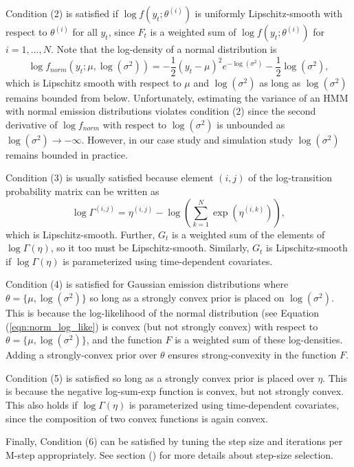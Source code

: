 Condition (2) is satisfied if $\log f(y_t ; \theta^{(i)})$ is uniformly Lipschitz-smooth with respect to $\theta^{(i)}$ for all $y_t$, since $F_t$ is a weighted sum of $\log f(y_t ; \theta^{(i)})$ for $i = 1,\ldots,N$. Note that the log-density of a normal distribution is
%
\begin{equation}
    \log f_{norm}\left(y_t;\mu,\log(\sigma^2)\right) = -\frac{1}{2}(y_t-\mu)^2 e^{-\log(\sigma^2)} - \frac{1}{2} \log(\sigma^2),
    \label{eqn:norm_log_like}
\end{equation}
%
which is Lipschitz smooth with respect to $\mu$ and $\log(\sigma^2)$ as long as $\log(\sigma^2)$ remains bounded from below. Unfortunately, estimating the variance of an HMM with normal emission distributions violates condition (2) since the second derivative of $\log f_{norm}$ with respect to $\log(\sigma^2)$ is unbounded as $\log(\sigma^2) \to -\infty$. However, in our case study and simulation study $\log(\sigma^2)$ remains bounded in practice.

Condition (3) is usually satisfied because element $(i,j)$ of the log-transition probability matrix can be written as
\begin{equation}
    \log \Gamma^{(i,j)} = \eta^{(i,j)} - \log\left(\sum_{k=1}^N\exp\left(\eta^{(i,k)}\right)\right),
\end{equation}
which is Lipschitz-smooth. Further, $G_t$ is a weighted sum of the elements of $\log \Gamma (\eta)$, so it too must be Lipschitz-smooth. Similarly, $G_t$ is Lipschitz-smooth if $\log \Gamma (\eta)$ is parameterized using time-dependent covariates.

Condition (4) is satisfied for Gaussian emission distributions where $\theta = \{\mu,\log(\sigma^2)\}$ so long as a strongly convex prior is placed on $\log(\sigma^2)$. This is because the log-likelihood of the normal distribution (see Equation (\ref{eqn:norm_log_like}) is convex (but not strongly convex) with respect to $\theta = \{\mu,\log(\sigma^2)\}$, and the function $F$ is a weighted sum of these log-densities. Adding a strongly-convex prior over $\theta$ ensures strong-convexity in the function $F$.

Condition (5) is satisfied so long as a strongly convex prior is placed over $\eta$. This is because the negative log-sum-exp function is convex, but not strongly convex. This also holds if $\log \Gamma (\eta)$ is parameterized using time-dependent covariates, since the composition of two convex functions is again convex.

Finally, Condition (6) can be satisfied by tuning the step size and iterations per M-step appropriately. See section (\label{sec:prac}) for more details about step-size selection.

